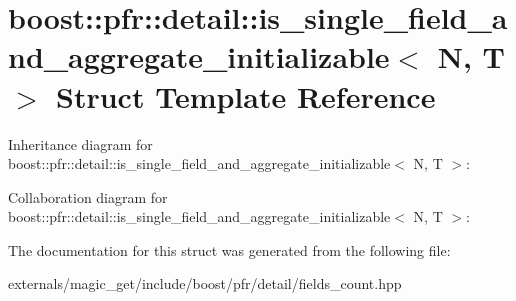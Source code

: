 \hypertarget{structboost_1_1pfr_1_1detail_1_1is__single__field__and__aggregate__initializable}{}\section{boost\+:\+:pfr\+:\+:detail\+:\+:is\+\_\+single\+\_\+field\+\_\+and\+\_\+aggregate\+\_\+initializable$<$ N, T $>$ Struct Template Reference}
\label{structboost_1_1pfr_1_1detail_1_1is__single__field__and__aggregate__initializable}


Inheritance diagram for boost\+:\+:pfr\+:\+:detail\+:\+:is\+\_\+single\+\_\+field\+\_\+and\+\_\+aggregate\+\_\+initializable$<$ N, T $>$\+:


Collaboration diagram for boost\+:\+:pfr\+:\+:detail\+:\+:is\+\_\+single\+\_\+field\+\_\+and\+\_\+aggregate\+\_\+initializable$<$ N, T $>$\+:


The documentation for this struct was generated from the following file\+:\begin{DoxyCompactItemize}
\item 
externals/magic\+\_\+get/include/boost/pfr/detail/fields\+\_\+count.\+hpp\end{DoxyCompactItemize}
